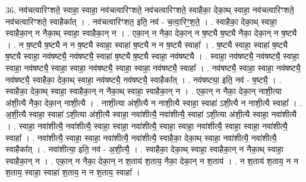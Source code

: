\documentclass[17pt]{extarticle}
\begin{document}
36. नव॑चत्वारिꣳशते॒ स्वाहा॒ स्वाहा॒ नव॑चत्वारिꣳशते॒ नव॑चत्वारिꣳशते॒ स्वाहैका॒ देका॒थ् स्वाहा॒ नव॑चत्वारिꣳशते॒ नव॑चत्वारिꣳशते॒ स्वाहैका᳚त् । . नव॑चत्वारिꣳशत॒ इति॒ नव॑ - च॒त्वा॒रिꣳ॒॒श॒ते॒ । . स्वाहैका॒ देका॒थ् स्वाहा॒ स्वाहैका॒न् न नैका॒थ् स्वाहा॒ स्वाहैका॒न् न । . एका॒न् न नैका॒ देका॒न् न ष॒ष्ट्यै ष॒ष्ट्यै नैका॒ देका॒न् न ष॒ष्ट्यै । . न ष॒ष्ट्यै ष॒ष्ट्यै न न ष॒ष्ट्यै स्वाहा॒ स्वाहा॑ ष॒ष्ट्यै न न ष॒ष्ट्यै स्वाहा᳚ । . ष॒ष्ट्यै स्वाहा॒ स्वाहा॑ ष॒ष्ट्यै ष॒ष्ट्यै स्वाहा॒ नव॑षष्ट्यै॒ नव॑षष्ट्यै॒ स्वाहा॑ ष॒ष्ट्यै ष॒ष्ट्यै स्वाहा॒ नव॑षष्ट्यै । . स्वाहा॒ नव॑षष्ट्यै॒ नव॑षष्ट्यै॒ स्वाहा॒ स्वाहा॒ नव॑षष्ट्यै॒ स्वाहा॒ स्वाहा॒ नव॑षष्ट्यै॒ स्वाहा॒ स्वाहा॒ नव॑षष्ट्यै॒ स्वाहा᳚ । . नव॑षष्ट्यै॒ स्वाहा॒ स्वाहा॒ नव॑षष्ट्यै॒ नव॑षष्ट्यै॒ स्वाहैका॒ देका॒थ् स्वाहा॒ नव॑षष्ट्यै॒ नव॑षष्ट्यै॒ स्वाहैका᳚त् । . नव॑षष्ट्या॒ इति॒ नव॑ - ष॒ष्ट्यै॒ । . स्वाहैका॒ देका॒थ् स्वाहा॒ स्वाहैका॒न् न नैका॒थ् स्वाहा॒ स्वाहैका॒न् न । . एका॒न् न नैका॒ देका॒न् नाशी॒त्या अ॑शी॒त्यै नैका॒ देका॒न् नाशी॒त्यै । . नाशी॒त्या अ॑शी॒त्यै न नाशी॒त्यै स्वाहा॒ स्वाहा॑ ऽशी॒त्यै न नाशी॒त्यै स्वाहा᳚ । . अ॒शी॒त्यै स्वाहा॒ स्वाहा॑ ऽशी॒त्या अ॑शी॒त्यै स्वाहा॒ नवा॑शीत्यै॒ नवा॑शीत्यै॒ स्वाहा॑ ऽशी॒त्या अ॑शी॒त्यै स्वाहा॒ नवा॑शीत्यै । . स्वाहा॒ नवा॑शीत्यै॒ नवा॑शीत्यै॒ स्वाहा॒ स्वाहा॒ नवा॑शीत्यै॒ स्वाहा॒ स्वाहा॒ नवा॑शीत्यै॒ स्वाहा॒ स्वाहा॒ नवा॑शीत्यै॒ स्वाहा᳚ । . नवा॑शीत्यै॒ स्वाहा॒ स्वाहा॒ नवा॑शीत्यै॒ नवा॑शीत्यै॒ स्वाहैका॒ देका॒थ् स्वाहा॒ नवा॑शीत्यै॒ नवा॑शीत्यै॒ स्वाहैका᳚त् । . नवा॑शीत्या॒ इति॒ नव॑ - अ॒शी॒त्यै॒ । . स्वाहैका॒ देका॒थ् स्वाहा॒ स्वाहैका॒न् न नैका॒थ् स्वाहा॒ स्वाहैका॒न् न । . एका॒न् न नैका॒ देका॒न् न श॒ताय॑ श॒ताय॒ नैका॒ देका॒न् न श॒ताय॑ । . न श॒ताय॑ श॒ताय॒ न न श॒ताय॒ स्वाहा॒ स्वाहा॑ श॒ताय॒ न न श॒ताय॒ स्वाहा᳚ । \newline
\end{document}
